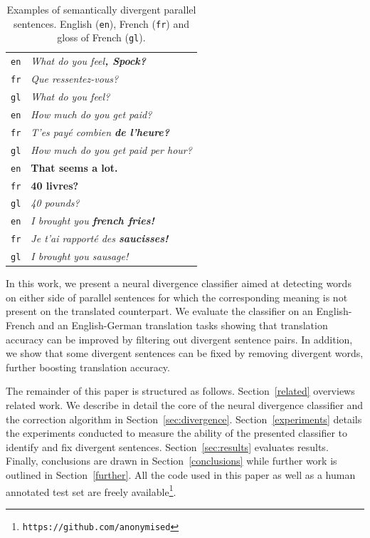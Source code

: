 \documentclass[11pt,a4paper]{article}
\begin{document}
\begin{table}[ht]
\small
\center
\begin{tabular}{ c|l }
  \hline  
  \texttt{en} & \it{What do you feel}\bf{, Spock}\it{?} \\
  \texttt{fr} & \it{Que ressentez-vous?} \\
  \texttt{gl} & {\small \it{What do you feel?}} \\
  \hline
  \texttt{en} & \it{How much do you get paid?} \\
  \texttt{fr} & \it{T'es pay\'e combien} \bf{de l'heure}\it{?} \\
  \texttt{gl} & {\small \it{How much do you get paid per hour?}} \\
  \hline  
  \texttt{en} &  \bf{That seems a lot.} \\
  \texttt{fr} & \bf{40 livres?} \\
  \texttt{gl} & {\small \it{40 pounds?}} \\
  \hline  
  \texttt{en} & \it{I brought you} \bf{french fries}\it{!} \\
  \texttt{fr} & \it{Je t'ai rapport\'e des} \bf{saucisses}\it{!} \\
  \texttt{gl} & {\small \it{I brought you sausage!}} \\
  \hline
\end{tabular}
\caption[Table caption text]{Examples of semantically divergent parallel sentences. English (\texttt{en}), French (\texttt{fr}) and gloss of French (\texttt{gl}). }
\label{tab:examples}
\end{table}

In this work, we present a neural divergence classifier aimed at detecting words on either side of parallel sentences for which the corresponding meaning is not present on the translated counterpart. 
We evaluate the classifier on an English-French and an English-German translation tasks showing that translation accuracy can be improved by filtering out divergent sentence pairs.
In addition, we  show that some divergent sentences can be fixed by removing divergent words, further boosting translation accuracy. 

The remainder of this paper is structured as follows. Section~\ref{related} overviews related work. 
We describe in detail the core of the neural divergence classifier and the correction algorithm in Section~\ref{sec:divergence}. 
Section~\ref{experiments} details the experiments conducted to measure the ability of the presented classifier to identify and fix divergent sentences.
Section~\ref{sec:results} evaluates results. 
Finally, conclusions are drawn in Section~\ref{conclusions} while further work is outlined in Section~\ref{further}.
All the code used in this paper as well as a human annotated test set are freely available\footnote{\texttt{https://github.com/anonymised}}.
\end{document}
